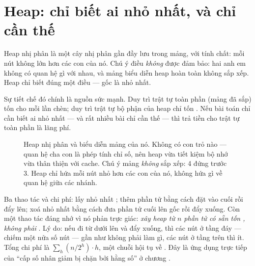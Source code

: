 \documentclass[../../algorithm.tex]{subfiles}
\begin{document}
\section{Heap: chỉ biết ai nhỏ nhất, và chỉ cần thế}

Heap nhị phân là một cây nhị phân gần đầy lưu trong mảng, với tính chất: mỗi nút không lớn hơn các con của nó. Chú ý điều \emph{không} được đảm bảo: hai anh em không có quan hệ gì với nhau, và mảng biểu diễn heap hoàn toàn không sắp xếp. Heap chỉ biết đúng một điều --- gốc là nhỏ nhất.

Sự tiết chế đó chính là nguồn sức mạnh. Duy trì trật tự toàn phần (mảng đã sắp) tốn  cho mỗi lần chèn; duy trì trật tự bộ phận của heap chỉ tốn . Nếu bài toán chỉ cần biết ai nhỏ nhất --- và rất nhiều bài chỉ cần thế --- thì trả tiền cho trật tự toàn phần là lãng phí.

\begin{figure}[H]\centering
{}
\caption{Heap nhị phân và biểu diễn mảng của nó. Không có con trỏ nào --- quan hệ cha con là phép tính chỉ số, nên heap vừa tiết kiệm bộ nhớ vừa thân thiện với cache. Chú ý mảng \emph{không} sắp xếp: 4 đứng trước 3. Heap chỉ hứa mỗi nút nhỏ hơn các con của nó, không hứa gì về quan hệ giữa các nhánh.}
\label{fig:heap}
\end{figure}

Ba thao tác và chi phí: lấy nhỏ nhất ; thêm phần tử  bằng cách đặt vào cuối rồi đẩy lên; xoá nhỏ nhất  bằng cách đưa phần tử cuối lên gốc rồi đẩy xuống. Còn một thao tác đáng nhớ vì nó phản trực giác: \emph{xây heap từ \(n\) phần tử có sẵn tốn , không phải }. Lý do: nếu đi từ dưới lên và đẩy xuống, thì các nút ở tầng đáy --- chiếm một nửa số nút --- gần như không phải làm gì, các nút ở tầng trên thì ít. Tổng chi phí là \(\sum_h (n/2^h)\cdot h\), một chuỗi hội tụ về . Đây là ứng dụng trực tiếp của ``cấp số nhân giảm bị chặn bởi hằng số'' ở chương .
\end{document}
